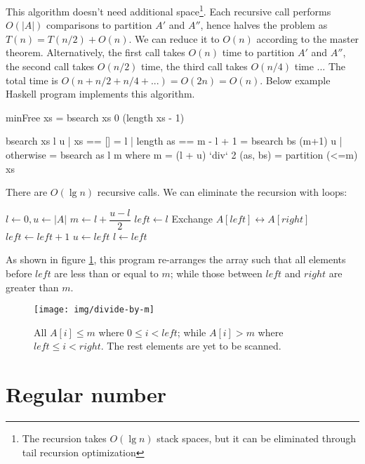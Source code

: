 \documentclass[b5paper]{article}
\begin{document}
This algorithm doesn't need additional space\footnote{The recursion takes $O(\lg n)$ stack spaces, but it can be eliminated through tail recursion optimization}. Each recursive call performs $O(|A|)$ comparisons to partition $A'$ and $A''$, hence halves the problem as $T(n) = T(n/2) + O(n)$. We can reduce it to $O(n)$ according to the master theorem. Alternatively, the first call takes $O(n)$ time to partition $A'$ and $A''$, the second call takes $O(n/2)$ time, the third call takes $O(n/4)$ time ... The total time is $O(n + n/2 + n/4 + ...) = O(2n) = O(n)$. Below example Haskell program implements this algorithm.

\lstset{frame = single}
\begin{Haskell}
minFree xs = bsearch xs 0 (length xs - 1)

bsearch xs l u | xs == [] = l
               | length as == m - l + 1 = bsearch bs (m+1) u
               | otherwise = bsearch as l m
    where
      m = (l + u) `div` 2
      (as, bs) = partition (<=m) xs
\end{Haskell}

There are $O(\lg n)$ recursive calls. We can eliminate the recursion with loops:

\begin{algorithmic}[1]
  \State $l \gets 0, u \gets |A|$
    \State $m \gets l + \dfrac{u - l}{2}$
    \State $left \gets l$
        \State Exchange $A[left] \leftrightarrow A[right]$
        \State $left \gets left + 1$
      \EndIf
    \EndFor
      \State $u \gets left$
    \Else
      \State $l \gets left$
    \EndIf
  \EndWhile
\EndFunction
\end{algorithmic}

As shown in figure \ref{fig:divide}, this program re-arranges the array such that all elements before $left$ are less than or equal to $m$; while those between $left$ and $right$ are greater than $m$.

\begin{figure}[htbp]
  \centering
  \texttt{[image: img/divide-by-m]}
  \caption{All $A[i] \leq m$ where $0 \leq i < left$; while $A[i] > m$ where $left \leq i < right$. The rest elements are yet to be scanned.}
  \label{fig:divide}
\end{figure}

\section*{Regular number}
\end{document}

